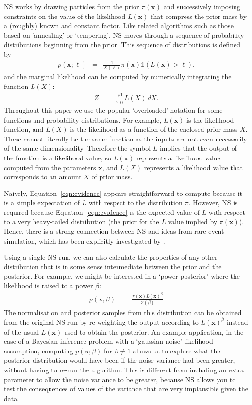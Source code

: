 \documentclass[journal,article,accept,moreauthors,pdftex,12pt,a4paper]{mdpi}
\newcommand{\xx}{\boldsymbol{x}}
\begin{document}
NS works by drawing particles from the
prior $\pi(\xx)$ and successively imposing constraints on the value of
the likelihood $L(\xx)$ that compress the prior mass by a (roughly) known
and constant factor. Like related algorithms such as those
based on `annealing' or `tempering', NS
moves through a sequence of probability distributions beginning from the
prior. This sequence of distributions is defined by
\begin{eqnarray}
p(\xx; \ell) &=& \frac{1}{X(\ell)}\pi(\xx)\mathds{1}\left(L(\xx) > \ell\right).
\label{eq:constrained_prior}
\end{eqnarray}
and the marginal likelihood can be computed by numerically integrating the
function $L(X)$:
\begin{eqnarray}
Z &=& \int_0^1 L(X)\, dX.
\end{eqnarray}
Throughout this paper we use the popular `overloaded' notation for some
functions and probability distributions.
For example, $L(\xx)$ is the likelihood function, and $L(X)$ is the likelihood
as a function of the enclosed prior mass $X$. These cannot literally be the
same function as the inputs are not even necessarily of the same dimensionality.
Therefore the symbol $L$ implies that the output of the function is a
likelihood value; so $L(\xx)$ represents a likelihood value computed from
the parameters $\xx$, and $L(X)$ represents a likelihood value that
corresponds to an amount $X$ of prior mass.

Naively, Equation~\ref{eqn:evidence} appears straightforward to compute because
it is a simple expectation of $L$ with respect to the distribution $\pi$.
However,
NS is required because Equation~\ref{eqn:evidence}
is the expected value of $L$ with respect to a very heavy-tailed distribution
(the prior for the $L$ value implied by $\pi(\xx)$). Hence, there is a strong
connection between NS and ideas from rare event simulation, which has been
explicitly investigated by \citet{walter}.

Using a single NS run, we can also calculate the properties of any other distribution that
is in some sense intermediate
between the prior and the posterior. For example, we might be interested in
a `power posterior' where the likelihood is raised to a power $\beta$:
\begin{eqnarray}
p(\xx; \beta) &=& \frac{\pi(\xx)L(\xx)^\beta}{Z(\beta)}\label{eqn:power_posterior}
\end{eqnarray}
The normalisation and posterior samples from this distribution can be obtained
from the original NS run by re-weighting the output according to $L(\xx)^\beta$
instead of the usual $L(\xx)$ used to obtain the posterior.
An example application, in the case of
a Bayesian inference problem with a `gaussian noise' likelihood assumption,
computing $p(\xx; \beta)$ for $\beta \neq 1$ allows us to explore what the
posterior distribution would have been if the noise variance had been greater,
without having to re-run the algorithm.
This is different from including an extra parameter to allow the noise variance
to be greater, because NS allows you to test the consequences of values of the
variance that are very implausible given the data.
\end{document}
